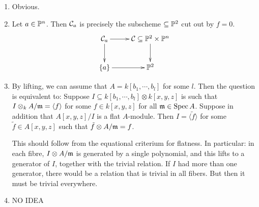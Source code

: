 \documentclass[11pt, english]{article}
\begin{document}
\begin{sol}
  \begin{enumerate}
  \item Obvious.
\item Let $a \in \mathbb{P}^n$. Then $\mathcal{C}_a$ is precisely the subscheme $\subseteq \mathbb{P}^2$ cut out by $f=0$. 
\[
\xymatrix{
\CC_a \ar[r] \ar[d] & \CC \subseteq \PP^2 \times \PP^n \ar[d] \\
\{a \} \ar[r] & \PP^2
}
\]
\item By lifting, we can assume that $A=k[b_1,\cdots,b_l]$ for some $l$. Then the question is equivalent to: Suppose $I \subseteq k[b_1,\cdots,b_l] \otimes k[x,y,z]$ is such that $I \otimes_k A/\mathfrak{m} = \langle f \rangle $ for some $f \in k[x,y,z]$ for all $\mathfrak{m} \in \operatorname{Spec} A$. Suppose in addition that $A[x,y,z]/I$ is a flat $A$-module. Then $I = \langle \tilde f \rangle$ for some $\tilde f \in A[x,y,z]$ such that $\tilde f  \otimes A/\mathfrak{m} = f$.

This should follow from the equational criterium for  flatness. In particular: in each fibre, $I \otimes A/\mathfrak{m}$ is generated by a single polynomial, and this lifts to a generator of $I$, together with the trivial relation. If $I$ had more than one generator, there would be a relation that is trivial in all fibers. But then it must be trivial everywhere. 
\item NO IDEA
  \end{enumerate}
\end{sol}
\end{document}
